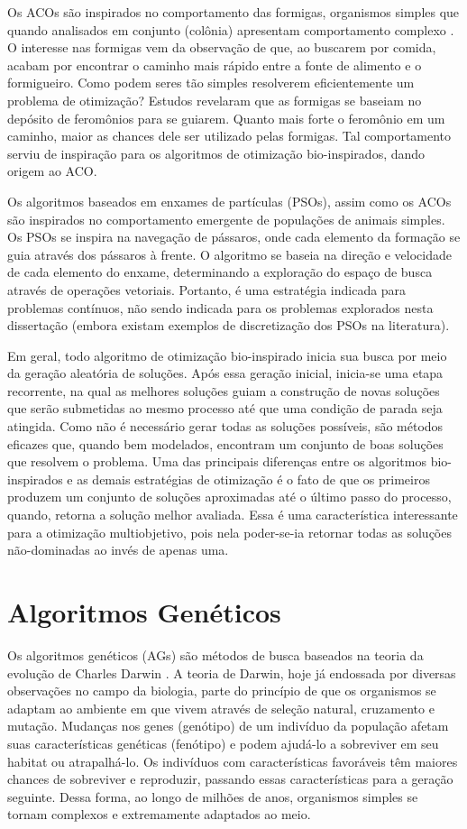 Os ACOs são inspirados no comportamento das formigas, organismos simples que quando analisados em conjunto (colônia) apresentam comportamento complexo \cite{Dorigo1996}. O interesse nas formigas vem da observação de que, ao buscarem por comida, acabam por encontrar o caminho mais rápido entre a fonte de alimento e o formigueiro. Como podem seres tão simples resolverem eficientemente um problema de otimização? Estudos revelaram que as formigas se baseiam no depósito de feromônios para se guiarem. Quanto mais forte o feromônio em um caminho, maior as chances dele ser utilizado pelas formigas. Tal comportamento serviu de inspiração para os algoritmos de otimização bio-inspirados, dando origem ao \ac{ACO}.

Os algoritmos baseados em enxames de partículas (PSOs), assim como os ACOs são inspirados no comportamento emergente de populações de animais simples. Os PSOs se inspira na navegação de pássaros, onde cada elemento da formação se guia através dos pássaros à frente. O algoritmo se baseia na direção e velocidade de cada elemento do enxame, determinando a exploração do espaço de busca através de operações vetoriais. Portanto, é uma estratégia indicada para problemas contínuos, não sendo indicada para os problemas explorados nesta dissertação (embora existam exemplos de discretização dos PSOs na literatura).

Em geral, todo algoritmo de otimização bio-inspirado inicia sua busca por meio da geração aleatória de soluções. Após essa geração inicial, inicia-se uma etapa recorrente, na qual as melhores soluções guiam a construção de novas soluções que serão submetidas ao mesmo processo até que uma condição de parada seja atingida. Como não é necessário gerar todas as soluções possíveis, são métodos eficazes que, quando bem modelados, encontram um conjunto de boas soluções que resolvem o problema. Uma das principais diferenças entre os algoritmos bio-inspirados e as demais estratégias de otimização é o fato de que os primeiros produzem um conjunto de soluções aproximadas até o último passo do processo, quando, retorna a solução melhor avaliada. Essa é uma característica interessante para a otimização multiobjetivo, pois nela poder-se-ia retornar todas as soluções não-dominadas ao invés de apenas uma.

\section{Algoritmos Genéticos}
\label{section_ag}
Os algoritmos genéticos (AGs) são métodos de busca baseados na teoria da evolução de Charles Darwin \cite{Darwin1859}. A teoria de Darwin, hoje já endossada por diversas observações no campo da biologia, parte do princípio de que os organismos se adaptam ao ambiente em que vivem através de seleção natural, cruzamento e mutação. Mudanças nos genes (genótipo) de um indivíduo da população afetam suas características genéticas (fenótipo) e podem ajudá-lo a sobreviver em seu habitat ou atrapalhá-lo. Os indivíduos com características favoráveis têm maiores chances de sobreviver e reproduzir, passando essas características para a geração seguinte. Dessa forma, ao longo de milhões de anos, organismos simples se tornam complexos e extremamente adaptados ao meio.

